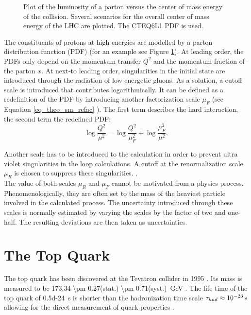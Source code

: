 \begin{figure}[ht]
  \caption{Plot of the luminosity of a parton versus the center of mass energy of the collision. Several scenarios for the overall center of mass energy of the LHC are plotted. The CTEQ6L1 PDF is used. \cite{Quigg:2009gg,Pumplin:2002vw}}
  \label{fig_theo_pdf}
\end{figure}

\newpage
The constituents of protons at high energies are modelled by a parton distribution function (PDF) (for an example see Figure \ref{fig_theo_pdf}). At leading order, the PDFs only depend on the momentum transfer $Q^2$ and the momentum fraction of the parton $x$. At next-to leading order, singularities in the initial state are introduced through the radiation of low energetic gluons. As a solution, a cutoff scale is introduced that contributes logarithmically. It can be defined as a redefinition of the PDF by introducing another factorization scale $\mu_F$ (see Equation \ref{eq_theo_sm_refac} \cite{tholen:ma,ubiali_phd}). The first term describes the hard interaction, the second term the redefined PDF:\\

\begin{equation}
\log \frac{Q^2}{\mu^2} = \log \frac{Q^2}{\mu^2_F} + \log \frac{\mu^2_F}{\mu^2}.
\label{eq_theo_sm_refac}
\end{equation}

Another scale has to be introduced to the calculation in order to prevent ultra violet singularities in the loop calculations. A cutoff at the renormalization scale $\mu_R$ is chosen to suppress these singularities. \cite{'tHooft:880603}. \\
The value of both scales $\mu_R$ and $\mu_F$ cannot be motivated from a physics process. Phenomenologically, they are often set to the mass of the heaviest particle involved in the calculated process. The uncertainty introduced through these scales is normally estimated by varying the scales by the factor of two and one-half. The resulting deviations are then taken as uncertainties.

\section{The Top Quark}

The top quark has been discovered at the Tevatron collider in 1995 \cite{Abe:1995hr,Abachi:1995iq}. Its mass is measured to be \SI[parse-numbers=false]{173.34 \pm 0.27(stat.) \pm 0.71(syst.)}{\giga \electronvolt} \cite{arXiv:1403.4427}. The life time of the top quark of \SI{0.5d-24}{\second} is shorter than the hadronization time scale $\tau_{had} \approx \SI{d-23}{\second}$ allowing for the direct measurement of quark properties \cite{toppdg}.

